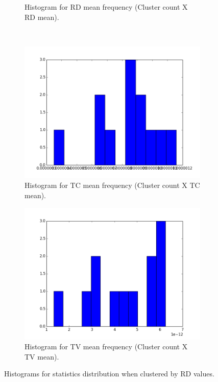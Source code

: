 \documentclass[a4paper,11pt]{report}
\begin{document}
\begin{figure}[!ht]
\begin{subfigure}[t]{.49\textwidth}
        \caption{Histogram for RD mean frequency (Cluster count X RD mean).}
        \label{subfig:fa_hist_rd}
      \end{subfigure}\hfill\\
      \begin{subfigure}[t]{.49\textwidth}
        \includegraphics[width=1\linewidth]{img/histograms/rd_clustered_fa_mask_tc_means_hist.png}
        \caption{Histogram for TC mean frequency (Cluster count X TC mean).}
        \label{subfig:fa_hist_tc}
      \end{subfigure}\hfill%
      \begin{subfigure}[t]{.49\textwidth}
        \includegraphics[width=1\linewidth]{img/histograms/rd_clustered_fa_mask_tv_means_hist.png}
        \caption{Histogram for TV mean frequency (Cluster count X TV mean).}
        \label{subfig:fa_hist_tv}
      \end{subfigure}\hfill

      \caption{Histograms for statistics distribution when clustered by RD values.}
      \label{fig:fa-histograms}
    \end{figure}
\end{document}
